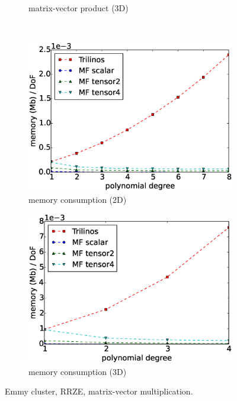 \documentclass[times,doublespace]{nmeauth}
\begin{document}
\begin{figure}[!ht]
\begin{subfigure}[b]{0.49\textwidth}
    \caption{matrix-vector product (3D)}
    \label{fig:benchmark_miehe_Emmy_vmult3}
  \end{subfigure}
  ~
  \begin{subfigure}[b]{0.49\textwidth}
      \centering
      \includegraphics[width=\textwidth]{Emmy_RRZE_memory2d.eps}
      \caption{memory consumption (2D)}
      \label{fig:benchmark_miehe_Emmy_memory2}
  \end{subfigure}
  \begin{subfigure}[b]{0.49\textwidth}
    \centering
    \includegraphics[width=\textwidth]{Emmy_RRZE_memory3d.eps}
    \caption{memory consumption (3D)}
    \label{fig:benchmark_miehe_Emmy_memory3}
  \end{subfigure}
  \caption{Emmy cluster, RRZE, matrix-vector multiplication.}%
  \label{fig:benchmark_miehe_Emmy}
\end{figure}
\end{document}

